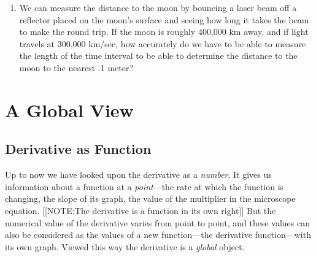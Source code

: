 \begin{enumerate}
  \begin{enumerate}
  \item Use the information given here to determine the value of $k$.

  \item If your estimate of the temperature is off by 5 degrees, how far
off is your estimate of the distance to the lightning strike?  How
significant is this source of error likely to be in comparison with
the imprecision with which you measured the 5 second time lapse?
(Suppose your uncertainty about the time is .25 seconds.)  Give a
clear analysis justifying your answer.


\end{enumerate}
\item We can measure the distance to the moon by bouncing a laser beam
off a reflector placed on the moon's surface and seeing how long it
takes the beam to make the round trip.  If the moon is roughly 400,000
km away, and if light travels at 300,000 km/sec, how accurately do we
have to be able to measure the length of the time interval to be able
to determine the distance to the moon to the nearest .1 meter?









\end{enumerate}
\section{A Global View}
\label{sec:a-global-view}

\subsection{Derivative as Function}
\label{subsec:derivative-as-function}

Up to now we have looked upon the derivative as a {\em number}.  It
gives us information about a function at a {\em point\/}---the rate at
which the function is changing, the slope of its graph, the value of
the multiplier in the microscope equation.
[[NOTE:The derivative  is a function  in its own right]]
But the numerical value of the derivative varies from point to point,
and these values can also be considered as the values of a new
function---the derivative function---with its own graph.  Viewed this
way the derivative is a {\em global\/} object.

